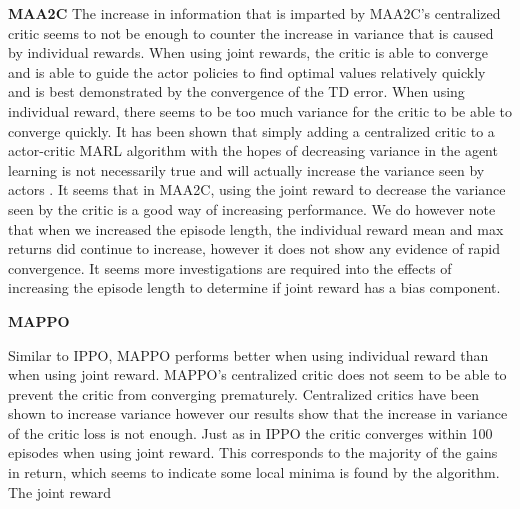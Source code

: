\documentclass[systems,article,submit,pdftex,moreauthors]{Definitions/mdpi}
\begin{document}
\textbf{MAA2C}
The increase in information that is imparted by MAA2C’s centralized critic seems to not be enough to counter the increase in variance that is caused by individual rewards. When using joint rewards, the critic is able to converge and is able to guide the actor policies to find optimal values relatively quickly and is best demonstrated by the convergence of the TD error. When using individual reward, there seems to be too much variance for the critic to be able to converge quickly. It has been shown that simply adding a centralized critic to a actor-critic MARL algorithm with the hopes of decreasing variance in the agent learning is not necessarily true and will actually increase the variance seen by actors \cite{DBLP:contrastingCentralizedDecentralized}. It seems that in MAA2C, using the joint reward to decrease the variance seen by the critic is a good way of increasing performance.   
We do however note that when we increased the episode length, the individual reward mean and max returns did continue to increase, however it does not show any evidence of rapid convergence. It seems more investigations are required into the effects of increasing the episode length to determine if joint reward has a bias component.

\textbf{MAPPO} 

Similar to IPPO, MAPPO performs better when using individual reward than when using joint reward. MAPPO's centralized critic does not seem to be able to prevent the critic from converging prematurely. Centralized critics have been shown to increase variance \cite{DBLP:contrastingCentralizedDecentralized} however our results show that the increase in variance of the critic loss is not enough. Just as in IPPO the critic converges within 100 episodes when using joint reward. This corresponds to the majority of the gains in return, which seems to indicate some local minima is found by the algorithm. The joint reward    
\end{document}
